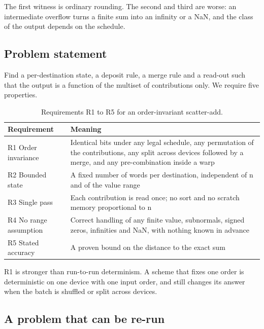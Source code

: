 \documentclass[3p,10pt]{elsarticle}
\begin{document}
The first witness is ordinary rounding. The second and third are worse:
an intermediate overflow turns a finite sum into an infinity or a NaN,
and the class of the output depends on the schedule.

\hypertarget{problem-statement}{%
\subsection{Problem statement}\label{problem-statement}}

Find a per-destination state, a deposit rule, a merge rule and a
read-out such that the output is a function of the multiset of
contributions only. We require five properties.

\begin{table}[!htbp]\centering\small\setlength{\tabcolsep}{4pt}
\caption{Requirements R1 to R5 for an order-invariant scatter-add.}\label{tab:2}
\begin{tabularx}{\linewidth}{>{\raggedright\arraybackslash\hsize=0.733\hsize}X>{\raggedright\arraybackslash\hsize=1.267\hsize}X}
\toprule
Requirement & Meaning \\
\midrule
R1 Order invariance & Identical bits under any legal schedule, any permutation of the
contributions, any split across devices followed by a merge, and any
pre-combination inside a warp \\
R2 Bounded state & A fixed number of words per destination, independent of n and of the
value range \\
R3 Single pass & Each contribution is read once; no sort and no scratch memory
proportional to n \\
R4 No range assumption & Correct handling of any finite value, subnormals, signed zeros,
infinities and NaN, with nothing known in advance \\
R5 Stated accuracy & A proven bound on the distance to the exact sum \\
\bottomrule
\end{tabularx}
\end{table}

R1 is stronger than run-to-run determinism. A scheme that fixes one
order is deterministic on one device with one input order, and still
changes its answer when the batch is shuffled or split across devices.

\hypertarget{a-problem-that-can-be-re-run}{%
\subsection{A problem that can be
re-run}\label{a-problem-that-can-be-re-run}}
\end{document}
